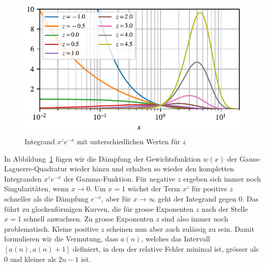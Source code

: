 \begin{figure}
\centering
% 
\includegraphics{papers/laguerre/images/integrand_exp.pdf}
\caption{Integrand $x^z e^{-x}$ mit unterschiedlichen Werten für $z$}
\label{laguerre:fig:integrand_exp}
\end{figure}

In Abbildung~\ref{laguerre:fig:integrand_exp} fügen wir
die Dämpfung der Gewichtsfunktion $w(x)$
der Gauss-Laguerre-Quadratur wieder hinzu
und erhalten so wieder den kompletten Integranden $x^{z} e^{-x}$
der Gamma-Funktion.
Für negative $z$ ergeben sich immer noch Singularitäten,
wenn $x \rightarrow 0$.
Um $x = 1$ wächst der Term $x^z$ für positive $z$
schneller als die Dämpfung $e^{-x}$,
aber für $x \rightarrow \infty$ geht der Integrand gegen $0$.
Das führt zu glockenförmigen Kurven,
die für grosse Exponenten $z$ nach der Stelle $x=1$ schnell anwachsen.
Zu grosse Exponenten $z$ sind also immer noch problematisch.
Kleine positive $z$ scheinen nun aber auch zulässig zu sein.
Damit formulieren wir die Vermutung,
dass $a(n)$,
welches das Intervall $[a(n), a(n) + 1]$ definiert,
in dem der relative Fehler minimal ist,
grösser als $0$ und kleiner als $2n-1$ ist.

